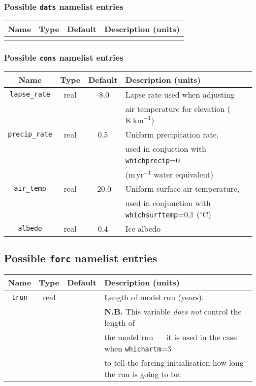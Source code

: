 \subsubsection{Possible \texttt{dats} namelist entries}
%
\begin{center}
\begin{tabular}{|c|c|c|l|}
\hline
Name & Type & Default & Description (units)\\
\hline
\hline
& & & \\
\hline
\end{tabular}
\end{center}
%
\subsubsection{Possible \texttt{cons} namelist entries}
%
\begin{center}
\begin{tabular}{|c|c|c|l|}
\hline
Name & Type & Default & Description (units)\\
\hline
\hline
\texttt{lapse\_rate} & real & -8.0 & Lapse rate used when adjusting \\
 & & & air temperature for elevation ($\mathrm{K}\,\mathrm{km}^{-1}$) \\
\hline
\texttt{precip\_rate} & real & 0.5 & Uniform precipitation rate,
\\
 & & & used in conjuction with \texttt{whichprecip}=0 \\
 & & & ($\mathrm{m}\,\mathrm{yr}^{-1}$ water equivalent) \\
\hline
\texttt{air\_temp} & real & -20.0 & Uniform surface air temperature, \\
 & & & used in conjunction with \texttt{whichsurftemp}=0,1 ($^{\circ}\mathrm{C}$) \\
\hline
\texttt{albedo} & real & 0.4 & Ice albedo \\
\hline
\end{tabular}
\end{center}
%
\subsection{Possible \texttt{forc} namelist entries}
%
\begin{center}
\begin{tabular}{|c|c|c|l|}
\hline
Name & Type & Default & Description (units)\\
\hline
\hline
\texttt{trun} & real & -- & Length of model run (years).\\
 & & & {\bf N.B.} This variable {\em does not} control the length of \\
 & & & the model run --- it is used in the case when \texttt{whichartm}=3 \\
 & & & to tell the forcing initialisation how long the run is going to be. \\
\hline
\end{tabular}
\end{center}